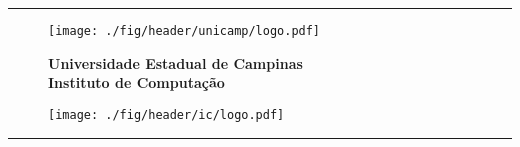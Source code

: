 \begin{center}
\rule{\textwidth}{1pt}
\end{center}

\vspace*{-0.2cm}

\begin{figure}[!ht]
    \begin{minipage}[b]{2.3cm}
        \centering
        \hspace*{0.4cm}
        \texttt{[image: ./fig/header/unicamp/logo.pdf]}
    \end{minipage}
    \begin{minipage}[b]{11.1cm}
        \centering
        \hspace*{0.4cm}
        {\large \bf Universidade Estadual de Campinas} \\[0.2cm]
        {\large \bf Instituto de Computação}
    \end{minipage}
    \begin{minipage}[b]{2.3cm}
        \centering
        \hspace*{0.4cm}
        \texttt{[image: ./fig/header/ic/logo.pdf]}
    \end{minipage}
\end{figure}

\vspace*{-0.2cm}

\begin{center}
    \rule{\textwidth}{1pt}
\end{center}

\vspace*{0.3cm}